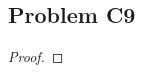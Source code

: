 \documentclass[../../../main.tex]{subfiles}
\begin{document}
\subsection{Problem C9}
\begin{wts}

\end{wts}
\begin{proof}

\end{proof}
\end{document}
